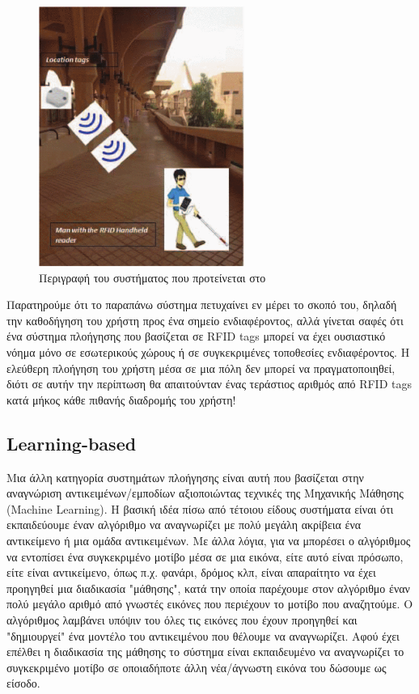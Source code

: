 \begin{figure}[H]
    \centering
    \includegraphics[width=0.6\textwidth]{images/rfid_paper.png}
    \caption{Περιγραφή του συστήματος που προτείνεται στο \cite{sammouda_mobile_2015}}
    \label{fig:sammouda_mobile}
\end{figure}
\hspace{1cm}

Παρατηρούμε ότι το παραπάνω σύστημα πετυχαίνει εν μέρει το σκοπό του, δηλαδή την καθοδήγηση του χρήστη προς ένα σημείο ενδιαφέροντος, αλλά γίνεται σαφές ότι ένα σύστημα πλοήγησης που βασίζεται σε RFID tags μπορεί να έχει ουσιαστικό νόημα μόνο σε εσωτερικούς χώρους ή σε συγκεκριμένες τοποθεσίες ενδιαφέροντος. Η ελεύθερη πλοήγηση του χρήστη μέσα σε μια πόλη δεν μπορεί να πραγματοποιηθεί, διότι σε αυτήν την περίπτωση θα απαιτούνταν ένας τεράστιος αριθμός από RFID tags κατά μήκος κάθε πιθανής διαδρομής του χρήστη!


\subsection{Learning-based}
Μια άλλη κατηγορία συστημάτων πλοήγησης είναι αυτή που βασίζεται στην αναγνώριση αντικειμένων/εμποδίων αξιοποιώντας τεχνικές της Μηχανικής Μάθησης (Machine Learning). Η βασική ιδέα πίσω από τέτοιου είδους συστήματα είναι ότι εκπαιδεύουμε έναν αλγόριθμο να αναγνωρίζει με πολύ μεγάλη ακρίβεια ένα αντικείμενο ή μια ομάδα αντικειμένων. Με άλλα λόγια, για να μπορέσει ο αλγόριθμος να εντοπίσει ένα συγκεκριμένο μοτίβο μέσα σε μια εικόνα, είτε αυτό είναι πρόσωπο, είτε είναι αντικείμενο, όπως π.χ. φανάρι, δρόμος κλπ, είναι απαραίτητο να έχει προηγηθεί μια διαδικασία "μάθησης", κατά την οποία παρέχουμε στον αλγόριθμο έναν πολύ μεγάλο αριθμό από γνωστές εικόνες που περιέχουν το μοτίβο που αναζητούμε. Ο αλγόριθμος λαμβάνει υπόψιν του όλες τις εικόνες που έχουν προηγηθεί και "δημιουργεί" ένα μοντέλο του αντικειμένου που θέλουμε να αναγνωρίζει. Αφού έχει επέλθει η διαδικασία της μάθησης το σύστημα είναι εκπαιδευμένο να αναγνωρίζει το συγκεκριμένο μοτίβο σε οποιαδήποτε άλλη νέα/άγνωστη εικόνα του δώσουμε ως είσοδο.

